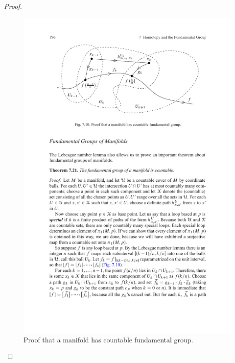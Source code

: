 \begin{proof}
\begin{figure}[htbp]
\centering
\includegraphics{fandamental-group-of-manifold}
\caption{Proof that a manifold has countable fundamental group.}
\end{figure}
\end{proof}
